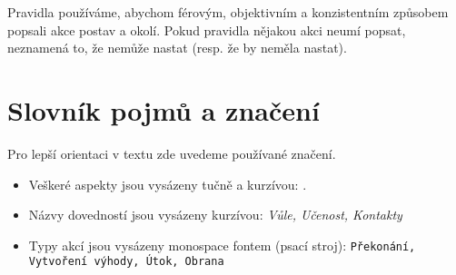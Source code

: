 Pravidla používáme, abychom férovým, objektivním a konzistentním způsobem popsali akce postav a okolí. Pokud pravidla nějakou akci neumí popsat, neznamená to, že nemůže nastat (resp. že by neměla nastat).

\section{Slovník pojmů a značení}
\label{sec:slovnik}
Pro lepší orientaci v textu zde uvedeme používané značení.

\begin{itemize}
\item Veškeré aspekty jsou vysázeny tučně a kurzívou: .
\item Názvy dovedností jsou vysázeny kurzívou: \textit{Vůle, Učenost, Kontakty}
\item Typy akcí jsou vysázeny monospace fontem (psací stroj): \texttt{Překonání, Vytvoření výhody, Útok, Obrana}
\end{itemize}


 


